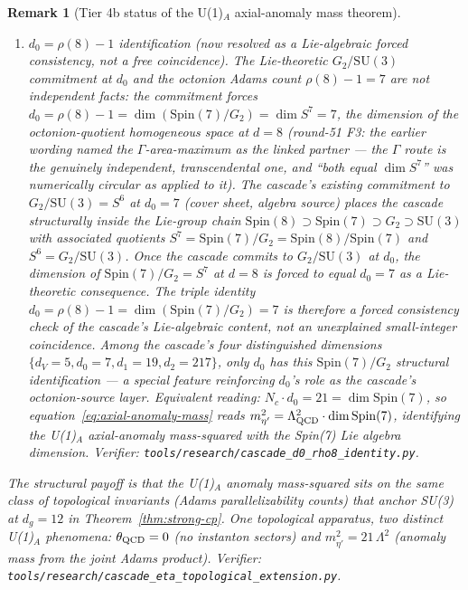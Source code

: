 \documentclass[12pt,a4paper]{article}
\newtheorem*{remark}{Remark}
\begin{document}
\begin{remark}[Tier 4b status of the U(1)$_A$ axial-anomaly mass theorem]
\begin{enumerate}
\item \emph{$d_0 = \rho(8) - 1$ identification (now resolved as a Lie-algebraic forced consistency, not a free coincidence).} The Lie-theoretic $G_2/\mathrm{SU}(3)$ commitment at $d_0$ and the octonion Adams count $\rho(8)-1=7$ are not independent facts: the commitment forces $d_0 = \rho(8)-1 = \dim(\mathrm{Spin}(7)/G_2) = \dim S^7 = 7$, the dimension of the octonion-quotient homogeneous space at $d=8$ (round-51 F3: the earlier wording named the $\Gamma$-area-maximum as the linked partner --- the $\Gamma$ route is the genuinely independent, transcendental one, and ``both equal $\dim S^7$'' was numerically circular as applied to it). The cascade's existing commitment to $G_2/\mathrm{SU}(3) = S^6$ at $d_0=7$ (cover sheet, algebra source) places the cascade structurally inside the Lie-group chain $\mathrm{Spin}(8)\supset\mathrm{Spin}(7)\supset G_2 \supset \mathrm{SU}(3)$ with associated quotients $S^7 = \mathrm{Spin}(7)/G_2 = \mathrm{Spin}(8)/\mathrm{Spin}(7)$ and $S^6 = G_2/\mathrm{SU}(3)$. Once the cascade commits to $G_2/\mathrm{SU}(3)$ at $d_0$, the dimension of $\mathrm{Spin}(7)/G_2 = S^7$ at $d=8$ is forced to equal $d_0 = 7$ as a Lie-theoretic consequence. The triple identity $d_0 = \rho(8)-1 = \dim(\mathrm{Spin}(7)/G_2) = 7$ is therefore a forced consistency check of the cascade's Lie-algebraic content, not an unexplained small-integer coincidence. Among the cascade's four distinguished dimensions $\{d_V=5, d_0=7, d_1=19, d_2=217\}$, only $d_0$ has this $\mathrm{Spin}(7)/G_2$ structural identification --- a special feature reinforcing $d_0$'s role as the cascade's octonion-source layer. Equivalent reading: $N_c\cdot d_0 = 21 = \dim\mathrm{Spin}(7)$, so equation~\eqref{eq:axial-anomaly-mass} reads $m_{\eta'}^2 = \Lambda_{\rm QCD}^2\cdot\dim\mathrm{Spin}(7)$, identifying the U(1)$_{\!A}$ axial-anomaly mass-squared with the Spin(7) Lie algebra dimension. Verifier: \texttt{tools/research/cascade\_d0\_rho8\_identity.py}.
\end{enumerate}
The structural payoff is that the U(1)$_{\!A}$ anomaly mass-squared sits on the same class of topological invariants (Adams parallelizability counts) that anchor SU(3) at $d_g=12$ in Theorem~\ref{thm:strong-cp}. One topological apparatus, two distinct U(1)$_{\!A}$ phenomena: $\theta_{\rm QCD}=0$ (no instanton sectors) and $m_{\eta'}^2 = 21\,\Lambda^2$ (anomaly mass from the joint Adams product). Verifier: \texttt{tools/research/cascade\_eta\_topological\_extension.py}.
\end{remark}
\end{document}
